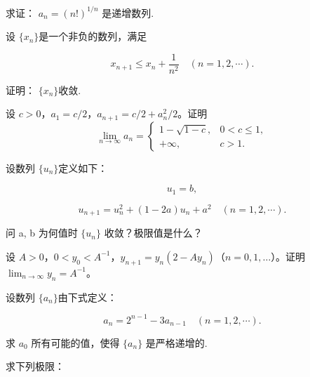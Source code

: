 \noindent\begin{minipage}{\textwidth}
求证： $ a_{n}=(n!)^{1/n} $ 是递增数列.
\end{minipage}\par\vfill
\noindent\begin{minipage}{\textwidth}
设 $ \{x_{n}\} $是一个非负的数列，满足

\[x_{n+1}\leqslant x_{n}+\frac{1}{n^{2}}\quad(n=1,2,\cdots).\]

证明： $ \{x_{n}\} $收敛.
\end{minipage}\par\vfill
\newpage
\noindent\begin{minipage}{\textwidth}
设 $c>0$，$a_1=c/2$，$a_{n+1}=c/2+a_n^2/2$。证明\[\lim_{n\to\infty}a_n=\begin{cases}1-\sqrt{1-c},&0<c\le1,\\+\infty,&c>1.\end{cases}\]
\end{minipage}\par\vfill
\noindent\begin{minipage}{\textwidth}
设数列 $ \{u_{n}\} $定义如下：

\[u_{1}=b,\]

\[u_{n+1}=u_{n}^{2}+(1-2a)u_{n}+a^{2}\quad(n=1,2,\cdots).\]

问 a, b 为何值时  $ \{u_{n}\} $ 收敛？极限值是什么？
\end{minipage}\par\vfill
\noindent\begin{minipage}{\textwidth}
设 $A>0$，$0<y_0<A^{-1}$，$y_{n+1}=y_n(2-Ay_n)$（$n=0,1,\ldots$）。证明 $\lim_{n\to\infty}y_n=A^{-1}$。
\end{minipage}\par\vfill
\newpage
\noindent\begin{minipage}{\textwidth}
设数列 $ \{a_{n}\} $由下式定义：

\[a_{n}=2^{n-1}-3a_{n-1}\quad(n=1,2,\cdots).\]

求  $ a_{0} $ 所有可能的值，使得  $ \{a_{n}\} $ 是严格递增的.
\end{minipage}\par\vfill
\noindent\begin{minipage}{\textwidth}
求下列极限：
\end{minipage}\par\vfill
